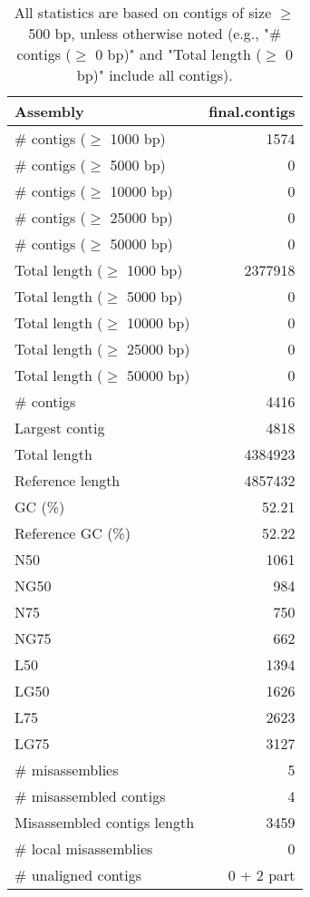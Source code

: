 \documentclass[12pt,a4paper]{article}
\begin{document}
\begin{table}[ht]
\begin{center}
\caption{All statistics are based on contigs of size $\geq$ 500 bp, unless otherwise noted (e.g., "\# contigs ($\geq$ 0 bp)" and "Total length ($\geq$ 0 bp)" include all contigs).}
\begin{tabular}{|l*{1}{|r}|}
\hline
Assembly & final.contigs \\ \hline
\# contigs ($\geq$ 1000 bp) & 1574 \\ \hline
\# contigs ($\geq$ 5000 bp) & 0 \\ \hline
\# contigs ($\geq$ 10000 bp) & 0 \\ \hline
\# contigs ($\geq$ 25000 bp) & 0 \\ \hline
\# contigs ($\geq$ 50000 bp) & 0 \\ \hline
Total length ($\geq$ 1000 bp) & 2377918 \\ \hline
Total length ($\geq$ 5000 bp) & 0 \\ \hline
Total length ($\geq$ 10000 bp) & 0 \\ \hline
Total length ($\geq$ 25000 bp) & 0 \\ \hline
Total length ($\geq$ 50000 bp) & 0 \\ \hline
\# contigs & 4416 \\ \hline
Largest contig & 4818 \\ \hline
Total length & 4384923 \\ \hline
Reference length & 4857432 \\ \hline
GC (\%) & 52.21 \\ \hline
Reference GC (\%) & 52.22 \\ \hline
N50 & 1061 \\ \hline
NG50 & 984 \\ \hline
N75 & 750 \\ \hline
NG75 & 662 \\ \hline
L50 & 1394 \\ \hline
LG50 & 1626 \\ \hline
L75 & 2623 \\ \hline
LG75 & 3127 \\ \hline
\# misassemblies & 5 \\ \hline
\# misassembled contigs & 4 \\ \hline
Misassembled contigs length & 3459 \\ \hline
\# local misassemblies & 0 \\ \hline
\# unaligned contigs & 0 + 2 part \\ \hline

\end{tabular}
\end{center}
\end{table}
\end{document}
